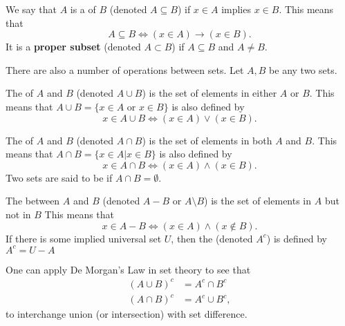 \begin{definition}
We say that $A$ is a  of $B$ (denoted $A\subseteq B$) if $x\in A$ implies $x\in B$.
This means that
\[ A\subseteq B  \Leftrightarrow (x\in A)\rightarrow (x\in B). \]
It is a \textbf{proper subset} (denoted $A\subset B$) if $A\subseteq B$ and $A\neq B$.
\end{definition}

There are also a number of operations between sets.
Let $A,B$ be any two sets.
\begin{definition}
The  of $A$ and $B$ (denoted $A\cup B$) is the set of elements in either $A$ or $B$.
This means that $A \cup B = \{ x\in A \textrm{ or } x\in B \}$ is also defined by
\[ x\in A\cup B \Leftrightarrow (x\in A)\vee (x\in B). \]
\end{definition}

\begin{definition}
The  of $A$ and $B$ (denoted $A\cap B$) is the set of elements in both $A$ and $B$.
This means that $A\cap B = \{x\in A | x\in B \}$ is also defined by
\[ x\in A\cap B \Leftrightarrow (x\in A)\wedge (x\in B). \]
Two sets are said to be  if $A\cap B = \emptyset$.
\end{definition}

\begin{definition}
The  between $A$ and $B$ (denoted $A-B$ or $A \setminus \!B$) is the set of elements in $A$ but not in $B$
This means that
\[ x\in A-B \Leftrightarrow (x\in A)\wedge (x\notin B). \]
If there is some implied universal set $U$, then the  (denoted $A^c$) is defined by $A^c = U-A$
\end{definition}

One can apply De Morgan's Law in set theory to see that
\begin{align*}
(A \cup B)^c & = A^c \cap B^c \\
(A \cap B)^c & = A^c \cup B^c,
\end{align*}
to interchange union (or intersection) with set difference.

